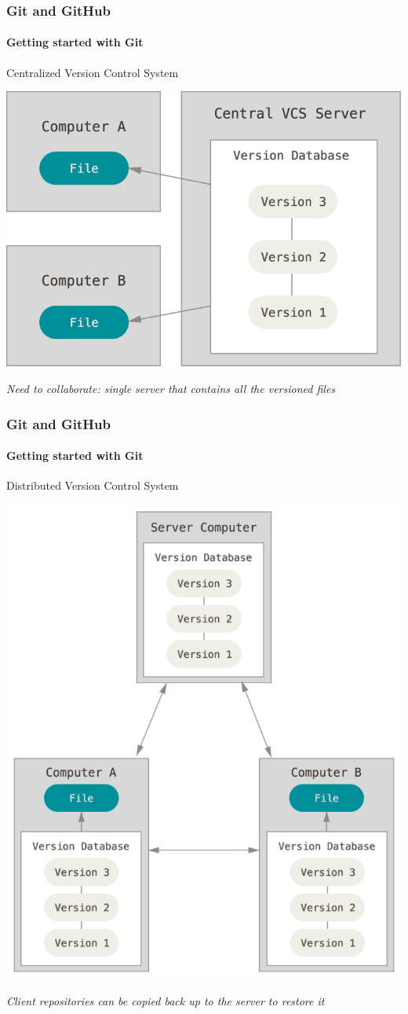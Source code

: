 \begin{frame}
    \frametitle{Git and GitHub}
    \framesubtitle{Getting started with Git}
    \addtocounter{nframe}{1}
    
    \begin{block}{Centralized Version Control System}
        \begin{center}

            \includegraphics[width=.7\textwidth]{imgs/centralized.png}
    
        \end{center}
    
    \end{block}

    \textit{Need to collaborate: single server that contains all the versioned files}

\end{frame}


\begin{frame}
    \frametitle{Git and GitHub}
    \framesubtitle{Getting started with Git}
    \addtocounter{nframe}{1}
    
    \begin{block}{Distributed Version Control System}
        \begin{center}

            \includegraphics[width=.5\textwidth]{imgs/distributed.png}
    
        \end{center}
    
    \end{block}

    \textit{Client repositories can be copied back up to the server to restore it}

\end{frame}

